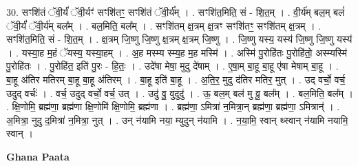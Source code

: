\documentclass[17pt]{extarticle}
\begin{document}
30. सꣳशि॑तं ॅवी॒र्यं॑ ॅवी॒र्यꣳ॑ सꣳशि॑तꣳ॒॒ सꣳशि॑तं ॅवी॒र्य᳚म् । . सꣳशि॑त॒मिति॒ सं - शि॒त॒म् । . वी॒र्य॑म् बल॒म् बलं॑ ॅवी॒र्यं॑ ॅवी॒र्य॑म् बल᳚म् । . बल॒मिति॒ बल᳚म् । . सꣳशि॑तम् क्ष॒त्रम् क्ष॒त्रꣳ सꣳशि॑तꣳ॒॒ सꣳशि॑तम् क्ष॒त्रम् । . सꣳशि॑त॒मिति॒ सं - शि॒त॒म् । . क्ष॒त्रम् जि॒ष्णु जि॒ष्णु क्ष॒त्रम् क्ष॒त्रम् जि॒ष्णु । . जि॒ष्णु यस्य॒ यस्य॑ जि॒ष्णु जि॒ष्णु यस्य॑ । . यस्या॒ह म॒हं ॅयस्य॒ यस्या॒हम् । . अ॒ह मस्म्य स्म्य॒ह म॒ह मस्मि॑ । . अस्मि॑ पु॒रोहि॑तः पु॒रोहि॑तो॒ अस्म्यस्मि॑ पु॒रोहि॑तः । . पु॒रोहि॑त॒ इति॑ पु॒रः - हि॒तः॒ । . उदे॑षा मेषा॒ मुदु दे॑षाम् । . ए॒षा॒म् बा॒हू बा॒हू ए॑षा मेषाम् बा॒हू । . बा॒हू अ॑तिर मतिरम् बा॒हू बा॒हू अ॑तिरम् । . बा॒हू इति॑ बा॒हू । . अ॒ति॒र॒ मुदु द॑तिर मतिर॒ मुत् । . उद् वर्चो॒ वर्च॒ उदुद् वर्चः॑ । . वर्च॒ उदुद् वर्चो॒ वर्च॒ उत् । . उदु॑ वु॒ वुदुदु॑ । . ऊ॒ बल॒म् बल॑ मु वू॒ बल᳚म् । . बल॒मिति॒ बल᳚म् । . क्षि॒णोमि॒ ब्रह्म॑णा॒ ब्रह्म॑णा क्षि॒णोमि॑ क्षि॒णोमि॒ ब्रह्म॑णा । . ब्रह्म॑णा॒ ऽमित्रा॑ न॒मित्रा॒न् ब्रह्म॑णा॒ ब्रह्म॑णा॒ ऽमित्रान्॑ । . अ॒मित्रा॒ नुदु द॒मित्रा॑ न॒मित्रा॒ नुत् । . उन् न॑यामि नया॒ म्युदुन् न॑यामि । . न॒या॒मि॒ स्वान् थ्स्वान् न॑यामि नयामि॒ स्वान् । \newline

\textbf{Ghana Paata } \newline
\end{document}
